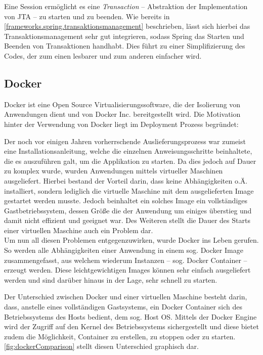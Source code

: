 				Eine Session ermöglicht es eine \textit{Transaction} -- Abstraktion der Implementation von \acs{JTA} -- zu starten und zu beenden. Wie bereits in \autoref{frameworks.spring.transaktionsmanagement} beschrieben, lässt sich hierbei das Transaktionsmanagement sehr gut integrieren, sodass Spring das Starten und Beenden von Transaktionen handhabt. Dies führt zu einer Simplifizierung des Codes, der zum einen lesbarer und zum anderen einfacher wird. 
				
		\subsection{Docker} %
		\label{frameworks.docker}
			
			Docker ist eine Open Source Virtualisierungssoftware, die der Isolierung von Anwendungen dient und von Docker Inc. bereitgestellt wird. Die Motivation hinter der Verwendung von Docker liegt im Deployment Prozess begründet: 
			
			Der noch vor einigen Jahren vorherrschende Auslieferungsprozess war zumeist eine Installationsanleitung, welche die einzelnen Anweisungsschritte beinhaltete, die es auszuführen galt, um die Applikation zu starten. Da dies jedoch auf Dauer zu komplex wurde, wurden Anwendungen mittels virtueller Maschinen ausgeliefert. Hierbei bestand der Vorteil darin, dass keine Abhängigkeiten o.Ä. installiert, sondern lediglich die virtuelle Maschine mit dem ausgelieferten Image gestartet werden musste. Jedoch beinhaltet ein solches Image ein vollständiges Gastbetriebssystem, dessen Größe die der Anwendung um einiges überstieg und damit nicht effizient und geeignet war. Des Weiteren stellt die Dauer des Starts einer virtuellen Maschine auch ein Problem dar. \\
			Um nun all diesen Problemen entgegenzuwirken, wurde Docker ins Leben gerufen. So werden alle Abhängigkeiten einer Anwendung in einem sog. Docker Image zusammengefasst, aus welchem wiederum Instanzen -- sog. Docker Container -- erzeugt werden. Diese leichtgewichtigen Images können sehr einfach ausgeliefert werden und sind darüber hinaus in der Lage, sehr schnell zu starten. \cite{Huber.2019}
			
			Der Unterschied zwischen Docker und einer virtuellen Maschine besteht darin, dass, anstelle eines vollständigen Gastsystems, ein Docker Container sich des Betriebssystems des Hosts bedient, dem sog. Host OS. Mittels der Docker Engine wird der Zugriff auf den Kernel des Betriebssystems sichergestellt und diese bietet zudem die Möglichkeit, Container zu erstellen, zu stoppen oder zu starten. \autoref{fig:dockerComparison} stellt diesen Unterschied graphisch dar. \cite{Turnbull.2014}
			
